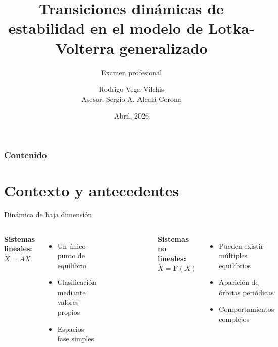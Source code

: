 \documentclass[10pt,aspectratio=169]{beamer}
\title{\textbf{Transiciones dinámicas de estabilidad en el modelo de Lotka-Volterra generalizado}}
\subtitle{Examen profesional}
\author{Rodrigo Vega Vilchis \\[4pt] \small Asesor: Sergio A. Alcalá Corona}
\institute{
	Facultad de Ciencias \\
	Universidad Nacional Autónoma de México
}
\date{Abril, 2026}
\theoremstyle{plain}
\theoremstyle{definition}
\begin{document}
\begin{frame}
	\titlepage
\end{frame}
\begin{frame}
	\frametitle{Contenido}
	\tableofcontents
\end{frame}

\section{Contexto y antecedentes}

\begin{frame}{Dinámica de baja dimensión}
	\begin{columns}[T]
		\textbf{Sistemas lineales: $\dot{X}=AX$}
		\begin{itemize}
			\item Un único punto de equilibrio 
			\item Clasificación mediante valores propios
			\item Espacios fase simples
		\end{itemize}
		\begin{figure}
			\centering
			
		\end{figure}
		
		
		\textbf{Sistemas no lineales: $\dot{X}=\textbf{F}(X)$}
		\begin{itemize}
			\item Pueden existir múltiples equilibrios
			\item Aparición de órbitas periódicas
			\item Comportamientos complejos
		\end{itemize}
		\begin{figure}
			\centering
			
		\end{figure}
	\end{columns}
\end{frame}
\end{document}
